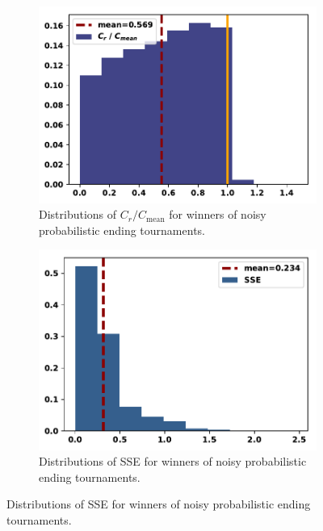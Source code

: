 \documentclass{article}
\begin{document}
\begin{figure}[!htbp]
    \centering
    \begin{subfigure}{0.35\textwidth}
        \centering
        \includegraphics[width=\textwidth]{../images/compared_to_mean_probend_noisy.pdf}
        \caption{Distributions of \(C_r / C_{\text{mean}}\) for winners of noisy probabilistic ending tournaments.}
    \end{subfigure}
    \begin{subfigure}{0.35\textwidth}
        \centering
        \includegraphics[width=\textwidth]{../images/sse_probend_noisy.pdf}
        \caption{Distributions of SSE for winners of noisy probabilistic ending tournaments.}
    \end{subfigure}
\end{figure}
\end{document}
